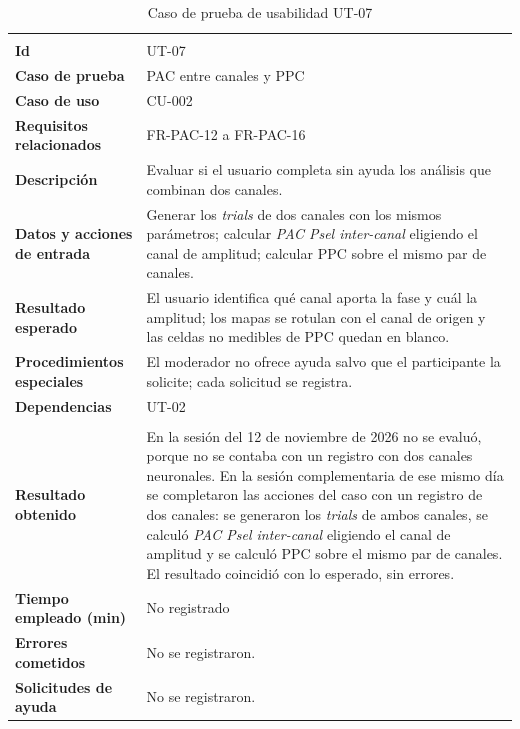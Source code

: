 \documentclass[12pt,letterpaper,oneside]{article}
\DeclareRobustCommand{\_}{\textunderscore\allowbreak}
\newcommand{\fechasesion}{12 de noviembre de 2026}
\begin{document}
\begin{center}
\small
\begin{longtable}{|>{\raggedright\arraybackslash}p{}|>{\raggedright\arraybackslash}p{}|}
\hline
\endfirsthead
\hline
\endhead
\hline
\endfoot
\hline
\caption{Caso de prueba de usabilidad UT-07} \label{tab:ut-07} \\
\endlastfoot
\textbf{Id} & UT-07 \\
\hline
\textbf{Caso de prueba} & PAC entre canales y PPC \\
\hline
\textbf{Caso de uso} & CU-002 \\
\hline
\textbf{Requisitos relacionados} & FR-PAC-12 a FR-PAC-16 \\
\hline
\textbf{Descripción} & Evaluar si el usuario completa sin ayuda los análisis que combinan dos canales. \\
\hline
\textbf{Datos y acciones de entrada} & Generar los \textit{trials} de dos canales con los mismos parámetros; calcular \textit{PAC Psel inter-canal} eligiendo el canal de amplitud; calcular PPC sobre el mismo par de canales. \\
\hline
\textbf{Resultado esperado} & El usuario identifica qué canal aporta la fase y cuál la amplitud; los mapas se rotulan con el canal de origen y las celdas no medibles de PPC quedan en blanco. \\
\hline
\textbf{Procedimientos especiales} & El moderador no ofrece ayuda salvo que el participante la solicite; cada solicitud se registra. \\
\hline
\textbf{Dependencias} & UT-02 \\
\hline
\multicolumn{2}{|c|}{\textbf{Información para el seguimiento}} \\
\hline
\textbf{Resultado obtenido} & En la sesión del \fechasesion{} no se evaluó, porque no se contaba con un registro con dos canales neuronales. En la sesión complementaria de ese mismo día se completaron las acciones del caso con un registro de dos canales: se generaron los \textit{trials} de ambos canales, se calculó \textit{PAC Psel inter-canal} eligiendo el canal de amplitud y se calculó PPC sobre el mismo par de canales. El resultado coincidió con lo esperado, sin errores. \\
\hline
\textbf{Tiempo empleado (min)} & No registrado \\
\hline
\textbf{Errores cometidos} & No se registraron. \\
\hline
\textbf{Solicitudes de ayuda} & No se registraron. \\

\end{longtable}
\end{center}
\end{document}
